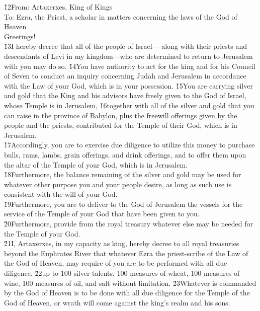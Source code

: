 \begin{poetry}
\poeml \v{12}From: Artaxerxes, King of Kings \\
\poeml To: Ezra, the Priest, a scholar in matters concerning the laws of the God of Heaven \\
\poeml Greetings! \\
\poeml \v{13}I hereby decree that all of the people of Israel--- along with their priests and descendants of Levi in my kingdom---who are determined to return to Jerusalem with you may do so. \v{14}You have authority to act for the king and for his Council of Seven to conduct an inquiry concerning Judah and Jerusalem in accordance with the Law of your God, which is in your possession. \v{15}You are carrying silver and gold that the King and his advisors have freely given to the God of Israel, whose Temple is in Jerusalem, \v{16}together with all of the silver and gold that you can raise in the province of Babylon, plus the freewill offerings given by the people and the priests, contributed for the Temple of their God, which is in Jerusalem. \\
\poeml \v{17}Accordingly, you are to exercise due diligence to utilize this money to purchase bulls, rams, lambs, grain offerings, and drink offerings, and to offer them upon the altar of the Temple of your God, which is in Jerusalem. \\
\poeml \v{18}Furthermore, the balance remaining of the silver and gold may be used for whatever other purpose you and your people desire, as long as such use is consistent with the will of your God. \\
\poeml \v{19}Furthermore, you are to deliver to the God of Jerusalem the vessels for the service of the Temple of your God that have been given to you. \\
\poeml \v{20}Furthermore, provide from the royal treasury whatever else may be needed for the Temple of your God. \\
\poeml \v{21}I, Artaxerxes, in my capacity as king, hereby decree to all royal treasuries beyond the Euphrates River that whatever Ezra the priest-scribe of the Law of the God of Heaven, may require of you are to be performed with all due diligence, \v{22}up to 100 silver talents, 100 measures of wheat, 100 measures of wine, 100 measures of oil, and salt without limitation. \v{23}Whatever is commanded by the God of Heaven is to be done with all due diligence for the Temple of the God of Heaven, or wrath will come against the king's realm and his sons. \\

\end{poetry}
